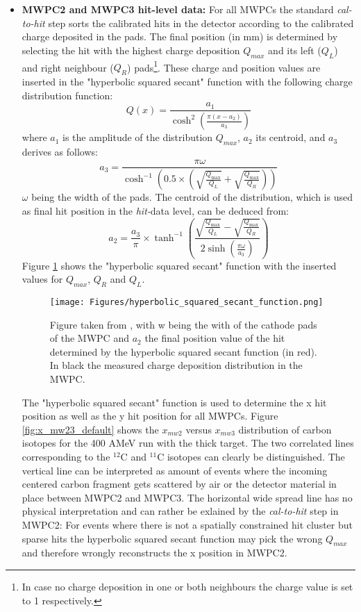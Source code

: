 \begin{itemize}
\itemsep0em
\item \textbf{MWPC2 and MWPC3 hit-level data:}\newline
For all MWPCs the standard  \textit{cal-to-hit} step  sorts the calibrated hits in the detector according to the calibrated charge deposited in the pads. The final position (in mm) is determined by selecting the hit with the highest charge deposition $Q_{max}$ and its left ($Q_L$) and right neighbour ($Q_R$) pads\footnote{In case no charge deposition in one or both neighbours the charge value is set to 1 respectively.}. These charge and position values are inserted in the "hyperbolic squared secant" function \cite{lau1995optimization} with the following charge distribution function:
\[
Q(x) = \frac{a_1}{\cosh^2\left(\frac{\pi (x - a_2)}{a_3}\right)}
\]
\vspace{-0.5em} %
where \(a_1\) is the amplitude of the distribution $Q_{max}$, \(a_2\) its centroid, and \(a_3\) derives as follows:
\[
a_3 = \frac{\pi \omega}{\cosh^{-1}\left(0.5 \times \left(\sqrt{\frac{Q_{\text{max}}}{Q_L}} + \sqrt{\frac{Q_{\text{max}}}{Q_R}}\right)\right)}
\]
\vspace{-0.5em} %
\(\omega\) being the width of the pads. The centroid of the distribution, which is used as final hit position in the \textit{hit-}data level, can be deduced from:
\vspace{-0.5em} %
\[
a_2 = \frac{a_3}{\pi} \times \tanh^{-1}\left(\frac{\sqrt{\frac{Q_{\text{max}}}{Q_L}} - \sqrt{\frac{Q_{\text{max}}}{Q_R}}}{2 \sinh\left(\frac{\pi \omega}{a_3}\right)}\right)
\]
Figure \ref{fig:hyp_function} shows the "hyperbolic squared secant" function with the inserted values for $Q_{max}$, $Q_R$ and $Q_L$. 
\begin{figure}[htpb]
    \centering
    \texttt{[image: Figures/hyperbolic\_squared\_secant\_function.png]}
    \caption{
   	 Figure taken from \cite{martin2021fission}, with w being the with of the cathode pads of the MWPC and $a_2$ the final position value of the hit determined by the hyperbolic squared secant function (in red). In black the measured charge deposition distribution in the MWPC. 
     }
    \label{fig:hyp_function}
\end{figure}
The "hyperbolic squared secant" function is used to determine the x hit position as well as the y hit position for all MWPCs. Figure \ref{fig:x_mw23_default} shows the $x_{mw2}$ versus $x_{mw3}$ distribution of carbon isotopes for the 400 AMeV run with the thick target. The two correlated lines corresponding to the $^{12}$C and $^{11}$C isotopes can clearly be distinguished. The vertical line can be interpreted as amount of events where the incoming centered carbon fragment gets scattered by air or the detector material in place between MWPC2 and MWPC3. The horizontal wide spread line has no physical interpretation and can rather be exlained by the \textit{cal-to-hit} step in MWPC2: For events where there is not a spatially constrained hit cluster but sparse hits the hyperbolic squared secant function may pick the wrong $Q_{max}$ and therefore wrongly reconstructs the x position in MWPC2. 

\end{itemize}
